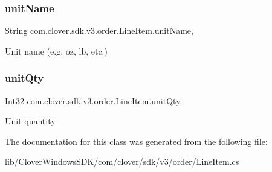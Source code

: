 \subsubsection{\texorpdfstring{unit\+Name}{unitName}}
{\footnotesize\ttfamily String com.\+clover.\+sdk.\+v3.\+order.\+Line\+Item.\+unit\+Name\hspace{0.3cm}{\ttfamily [get]}, {\ttfamily [set]}}



Unit name (e.\+g. oz, lb, etc.) 

\mbox{\label{classcom_1_1clover_1_1sdk_1_1v3_1_1order_1_1_line_item_a92ddb3af9ce72f7fb31afbef9a969e32}} 
\subsubsection{\texorpdfstring{unit\+Qty}{unitQty}}
{\footnotesize\ttfamily Int32 com.\+clover.\+sdk.\+v3.\+order.\+Line\+Item.\+unit\+Qty\hspace{0.3cm}{\ttfamily [get]}, {\ttfamily [set]}}



Unit quantity 



The documentation for this class was generated from the following file\+:\begin{DoxyCompactItemize}
\item 
lib/\+Clover\+Windows\+S\+D\+K/com/clover/sdk/v3/order/Line\+Item.\+cs\end{DoxyCompactItemize}
